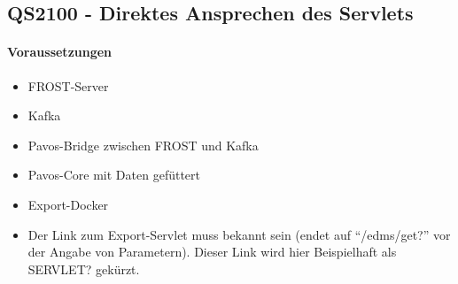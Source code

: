 \subsection{QS2100 - Direktes Ansprechen des Servlets}
\paragraph{Voraussetzungen}
\begin{itemize}
\item FROST-Server
\item Kafka
\item Pavos-Bridge zwischen FROST und Kafka
\item Pavos-Core mit Daten gefüttert
\item Export-Docker
\item Der Link zum Export-Servlet muss bekannt sein (endet auf ``/edms/get?'' vor der Angabe von Parametern). Dieser Link wird hier Beispielhaft als SERVLET? gekürzt.
\end{itemize}
